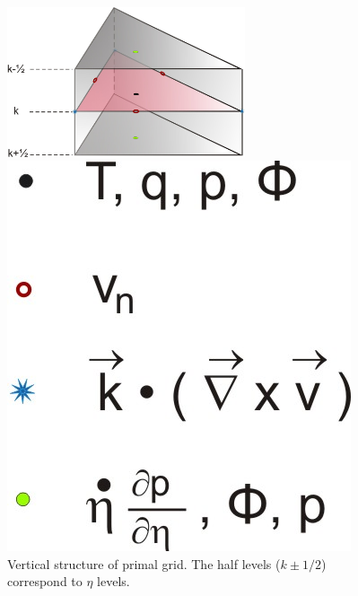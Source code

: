 \documentclass[a4paper,11pt,DIV16,BCOR1cm,titlepage]{scrartcl}
\begin{document}
\begin{figure}[tbh]
\begin{minipage}[t]{\linewidth}
    \begin{minipage}[tbh]{0.77\linewidth}
      \centering
      \includegraphics[width=7cm,draft=false]{../contrib/ICON_Grafik2_Okt09.jpg} %
    \end{minipage}
    \begin{minipage}[t]{0.2\linewidth}
      \includegraphics[width=3.cm,draft=false]{../contrib/ICON_Grafik2_Legende_Okt09.jpg} %
    \end{minipage}
    \caption{Vertical structure of primal grid. The half levels ($k\pm 1/2$) correspond to $\eta$ 
    levels.}\label{fig:vert_grid}
  \end{minipage}
\end{figure}
\end{document}
